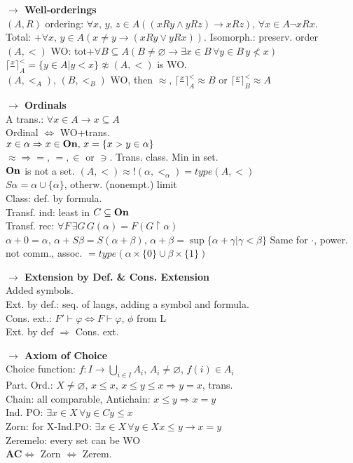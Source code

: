 \documentclass[9pt]{article}
\newcommand{\class}[1]{{\bf #1}}
\newcommand{\mytitle}[1]{ {\bf $\rightarrow$ #1}\\}
\newcommand{\On}{\class{On}}
\begin{document}
\begin{multicols*}{2}
\mytitle{Well-orderings}
$(A,R)$ ordering: $\forall x,\,y,\,z\in A\left((xRy\wedge yRz)\to xRz\right)$,
$\forall x\in A\neg xRx$.\\
Total: +$\forall x,\,y\in A\left(x\neq y\to(xRy\vee yRx)\right)$.
Isomorph.: preserv. order\\
$(A,<)$ WO: tot+$\forall B\subseteq A\left(B\neq \varnothing\to \exists x\in B\,\forall y\in B\,y\nless x\right)$\\
$\lceil \frac{x}{\,}\rceil_A^<=\{y\in A|y<x\}\not\approx (A,<)$ is WO.\\
$(A,<_A),\,(B,<_B)$ WO, then $\approx$, $\lceil \frac{x}{\,}\rceil_A^<\approx B$ or $\lceil \frac{x}{\,}\rceil_B^<\approx A$

\mytitle{Ordinals}
A trans.: $\forall x\in A\to x\subseteq A$\\
Ordinal $\Leftrightarrow$ WO+trans.\\
$x\in \alpha\Rightarrow x\in \On,\,x=\{x>y\in \alpha\}$\\
$\approx\Rightarrow=$, $=,\in$ or $\ni$. Trans. class. Min in set.\\
$\On$ is not a set. $(A,<)\approx !(\alpha,<_\alpha)=type(A,<)$\\
$S\alpha=\alpha\cup\{\alpha\}$, otherw. (nonempt.) limit\\
Class: def. by formula.\\
Transf. ind: least in $C\subseteq \On$\\
Transf. rec: $\forall F\,\exists G\,G(\alpha)=F(G\upharpoonright\alpha)$\\
$\alpha+0=\alpha$, $\alpha+S\beta=S(\alpha+\beta)$, $\alpha+\beta=\sup\{\alpha+\gamma|\gamma<\beta\}$
Same for $\cdot$, power.\\
not comm., assoc. $=type(\alpha\times\{0\}\cup\beta\times\{1\})$

\mytitle{Extension by Def. \& Cons. Extension}
Added symbols.\\
Ext. by def.: seq. of langs, adding a symbol and formula.\\
Cons. ext.: $F'\vdash \varphi\Leftrightarrow F\vdash\varphi$, $\phi$ from L\\
Ext. by def $\Rightarrow$ Cons. ext.

\mytitle{Axiom of Choice}
Choice function: $f\colon I\to \bigcup\limits_{i\in I}A_i$, $A_i\neq\varnothing$, $f(i)\in A_i$\\
Part. Ord.: $X\neq\varnothing$, $x\leqslant x$, $x\leqslant y\leqslant x\Rightarrow y=x$, trans.\\
Chain: all comparable, Antichain: $x\leqslant y\Rightarrow x=y$\\
Ind. PO: $\exists x\in X\,\forall y\in C y\leqslant x$\\
Zorn: for X-Ind.PO: $\exists x\in X\,\forall y\in X x\leqslant y\rightarrow x=y$\\
Zeremelo: every set can be WO\\
\class{AC}$\Leftrightarrow$ Zorn $\Leftrightarrow$ Zerem.


\end{multicols*}
\end{document}
